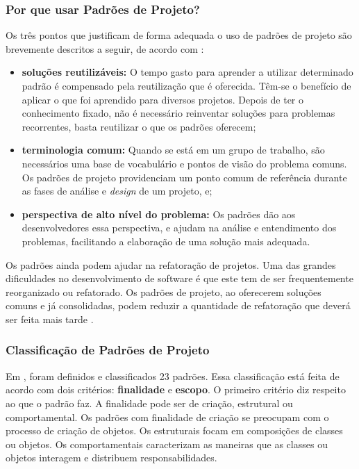 \subsubsection{Por que usar Padrões de Projeto?}

Os três pontos que justificam de forma adequada o uso de padrões de projeto são brevemente descritos a seguir, de acordo com \cite{Shalloway:Trott:2004}:

\begin{itemize}
	\item \textbf{soluções reutilizáveis:} O tempo gasto para aprender a utilizar determinado padrão é compensado pela reutilização que é oferecida. Têm-se o benefício de aplicar o que foi aprendido para diversos projetos. Depois de ter o conhecimento fixado, não é necessário reinventar soluções para problemas recorrentes, basta reutilizar o que os padrões oferecem;
	\item \textbf{terminologia comum:} Quando se está em um grupo de trabalho, são necessários uma base de vocabulário e pontos de visão do problema comuns. Os padrões de projeto providenciam um ponto comum de referência durante as fases de análise e \textit{design} de um projeto, e;
	\item \textbf{perspectiva de alto nível do problema:} Os padrões dão aos desenvolvedores essa perspectiva, e ajudam na análise e entendimento dos problemas, facilitando a elaboração de uma solução mais adequada.
\end{itemize}

Os padrões ainda podem ajudar na refatoração de projetos. Uma das grandes dificuldades no desenvolvimento de software é que este tem de ser frequentemente reorganizado ou refatorado. Os padrões de projeto, ao oferecerem soluções comuns e já consolidadas, podem reduzir a quantidade de refatoração que deverá ser feita mais tarde \cite{Gamma:1995}.

\subsubsection{Classificação de Padrões de Projeto}

Em \cite{Gamma:1995}, foram definidos e classificados 23 padrões. Essa classificação está feita de acordo com dois critérios: \textbf{finalidade} e \textbf{escopo}. O primeiro critério diz respeito ao que o padrão faz. A finalidade pode ser de criação, estrutural ou comportamental. Os padrões com finalidade de criação se preocupam com o processo de criação de objetos. Os estruturais focam em composições de classes ou objetos. Os comportamentais caracterizam as maneiras que as classes ou objetos interagem e distribuem responsabilidades.


